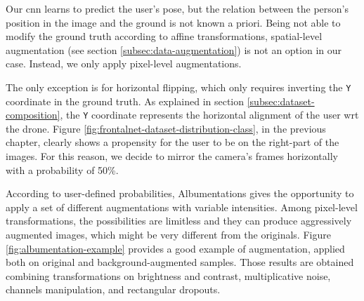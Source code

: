 \medskip

Our \gls{cnn} learns to predict the user's pose, but the relation between the person's position in the image and the ground is not known a priori. Being not able to modify the ground truth according to affine transformations, spatial-level augmentation (see section \ref{subsec:data-augmentation}) is not an option in our case. Instead, we only apply pixel-level augmentations. 

The only exception is for horizontal flipping, which only requires inverting the \texttt{Y} coordinate in the ground truth. As explained in section \ref{subsec:dataset-composition}, the \texttt{Y} coordinate represents the horizontal alignment of the user \gls{wrt} the drone. Figure \ref{fig:frontalnet-dataset-distribution-class}, in the previous chapter, clearly shows a propensity for the user to be on the right-part of the images. For this reason, we decide to mirror the camera's frames horizontally with a probability of 50\%.

\medskip

According to user-defined probabilities, Albumentations gives the opportunity to apply a set of different augmentations with variable intensities. Among pixel-level transformations, the possibilities are limitless and they can produce aggressively augmented images, which might be very different from the originals. Figure \ref{fig:albumentation-example} provides a good example of augmentation, applied both on original and background-augmented samples. Those results are obtained combining transformations on brightness and contrast, multiplicative noise, channels manipulation, and rectangular dropouts.

